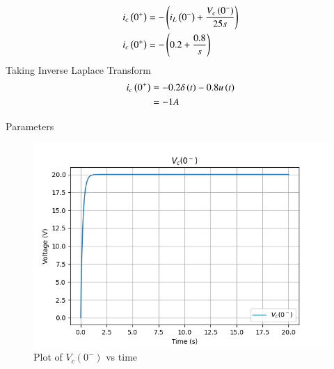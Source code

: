 \documentclass[journal,12pt,twocolumn]{IEEEtran}
\begin{document}
\bigskip


\begin{align}
    i_c \left(0^+\right) &= - \left(i_L \left(0^-\right) + \frac{V_c \left(0^-\right)}{25s}\right)\\
    i_c \left(0^+\right) &= -\left(0.2 + \frac{0.8}{s}\right)
\end{align}
Taking Inverse Laplace Transform
\begin{align}
      i_c \left(0^+\right) &= -0.2 \delta \left(t\right) - 0.8u \left(t\right)\\
      &=-1A
\end{align}

\begin{table}[ht]
    \begin{adjustbox}{width=\columnwidth}
       
    \end{adjustbox}
    \caption{Parameters}
    \label{tab:Gate.ec.44.1}

\end{table}

\newpage

\begin{figure}[ht]
   \centering
   \includegraphics[width=1.2\columnwidth]{figs/ckt2.png}
   \caption{Plot of $V_c(0^-)$ vs time}
\end{figure}
\end{document}
